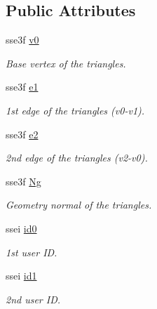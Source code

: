 \subsection*{Public Attributes}
\begin{DoxyCompactItemize}
\item 
sse3f \hyperlink{structembree_1_1_triangle4_a6c0d196de65c16626387c56ba45b019d}{v0}
\begin{DoxyCompactList}\small\item\em Base vertex of the triangles. \item\end{DoxyCompactList}\item 
sse3f \hyperlink{structembree_1_1_triangle4_a2667c1aa50255c1d97d2f72241cc18a6}{e1}
\begin{DoxyCompactList}\small\item\em 1st edge of the triangles (v0-\/v1). \item\end{DoxyCompactList}\item 
sse3f \hyperlink{structembree_1_1_triangle4_aa8967fac9fd72a914d0a55337f230a5d}{e2}
\begin{DoxyCompactList}\small\item\em 2nd edge of the triangles (v2-\/v0). \item\end{DoxyCompactList}\item 
sse3f \hyperlink{structembree_1_1_triangle4_a0ab213645841eb42897e3d61a9cd3528}{Ng}
\begin{DoxyCompactList}\small\item\em Geometry normal of the triangles. \item\end{DoxyCompactList}\item 
ssei \hyperlink{structembree_1_1_triangle4_ac3629f411789f1190eea10d3f104bb2d}{id0}
\begin{DoxyCompactList}\small\item\em 1st user ID. \item\end{DoxyCompactList}\item 
ssei \hyperlink{structembree_1_1_triangle4_af3ef7b3e6c8140aad0ee6de92083348b}{id1}
\begin{DoxyCompactList}\small\item\em 2nd user ID. \item\end{DoxyCompactList}\end{DoxyCompactItemize}


